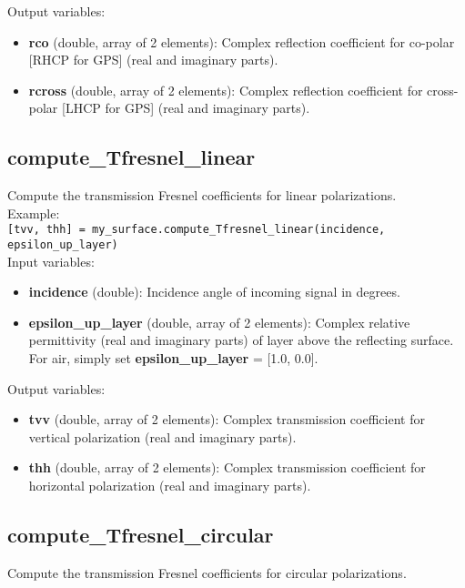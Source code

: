 Output variables:
\begin{itemize}
\item {\bf rco} (double, array of 2 elements): Complex reflection coefficient for co-polar [RHCP for GPS] (real and imaginary parts).
\item {\bf rcross} (double, array of 2 elements): Complex reflection coefficient for cross-polar [LHCP for GPS] (real and imaginary parts).
\end{itemize}


\subsection{compute\_Tfresnel\_linear}

Compute the transmission Fresnel coefficients for linear polarizations.\\

Example:\\

\texttt{[tvv, thh] = my\_surface.compute\_Tfresnel\_linear(incidence, epsilon\_up\_layer)}\\

Input variables:
\begin{itemize}
\item {\bf incidence} (double): Incidence angle of incoming signal in degrees.
\item {\bf epsilon\_up\_layer} (double, array of 2 elements): Complex relative permittivity (real and imaginary parts) of layer above the reflecting surface. For air, simply set {\bf epsilon\_up\_layer} = [1.0, 0.0].
\end{itemize}

Output variables:
\begin{itemize}
\item {\bf tvv} (double, array of 2 elements): Complex transmission coefficient for vertical polarization (real and imaginary parts).
\item {\bf thh} (double, array of 2 elements): Complex transmission coefficient for horizontal polarization (real and imaginary parts).
\end{itemize}


\subsection{compute\_Tfresnel\_circular}

Compute the transmission Fresnel coefficients for circular polarizations.\\

